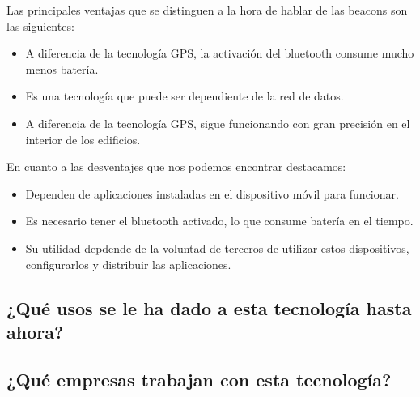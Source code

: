 Las principales ventajas que se distinguen a la hora de hablar de las beacons son las siguientes: 

\begin{itemize}
\item A diferencia de la tecnología GPS, la activación del bluetooth consume mucho menos batería. 
\item Es una tecnología que puede ser dependiente de la red de datos. 
\item A diferencia de la tecnología GPS, sigue funcionando con gran precisión en el interior de los edificios.
\end{itemize}

En cuanto a las desventajes que nos podemos encontrar destacamos:

\begin{itemize}
\item Dependen de aplicaciones instaladas en el dispositivo móvil para funcionar. 
\item Es necesario tener el bluetooth activado, lo que consume batería en el tiempo. 
\item Su utilidad depdende de la voluntad de terceros de utilizar estos dispositivos, configurarlos y distribuir las aplicaciones.
\end{itemize}

\subsection{¿Qué usos se le ha dado a esta tecnología hasta ahora?}



\subsection{¿Qué empresas trabajan con esta tecnología?}





